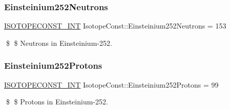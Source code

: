 \subsubsection{\texorpdfstring{Einsteinium252\+Neutrons}{Einsteinium252Neutrons}}
{\footnotesize\ttfamily \mbox{\hyperlink{group___isotope_const-_macros_ga5f18360b3e99483a35c32d789e62621c}{I\+S\+O\+T\+O\+P\+E\+C\+O\+N\+S\+T\+\_\+\+I\+NT}} Isotope\+Const\+::\+Einsteinium252\+Neutrons = 153}

\$ \$ Neutrons in Einsteinium-\/252. \mbox{\label{group___isotope_const-_einsteinium-_es252_gaf0f8081c7976f74aef4d86cfe8b99d24}} 
\subsubsection{\texorpdfstring{Einsteinium252\+Protons}{Einsteinium252Protons}}
{\footnotesize\ttfamily \mbox{\hyperlink{group___isotope_const-_macros_ga5f18360b3e99483a35c32d789e62621c}{I\+S\+O\+T\+O\+P\+E\+C\+O\+N\+S\+T\+\_\+\+I\+NT}} Isotope\+Const\+::\+Einsteinium252\+Protons = 99}

\$ \$ Protons in Einsteinium-\/252. 